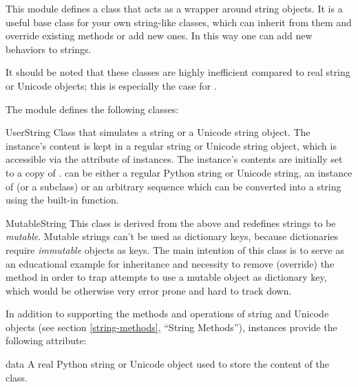 

This module defines a class that acts as a wrapper around string
objects.  It is a useful base class for your own string-like classes,
which can inherit from them and override existing methods or add new
ones.  In this way one can add new behaviors to strings.

It should be noted that these classes are highly inefficient compared
to real string or Unicode objects; this is especially the case for
.

The  module defines the following classes:

\begin{classdesc}{UserString}{}
Class that simulates a string or a Unicode string
object.  The instance's content is kept in a regular string or Unicode
string object, which is accessible via the  attribute of
 instances.  The instance's contents are initially
set to a copy of .   can be either a
regular Python string or Unicode string, an instance of
 (or a subclass) or an arbitrary sequence which can
be converted into a string using the built-in  function.
\end{classdesc}

\begin{classdesc}{MutableString}{}
This class is derived from the  above and redefines
strings to be \emph{mutable}.  Mutable strings can't be used as
dictionary keys, because dictionaries require \emph{immutable} objects as
keys.  The main intention of this class is to serve as an educational
example for inheritance and necessity to remove (override) the
 method in order to trap attempts to use a
mutable object as dictionary key, which would be otherwise very
error prone and hard to track down.
\end{classdesc}

In addition to supporting the methods and operations of string and
Unicode objects (see section \ref{string-methods}, ``String
Methods''),  instances provide the following
attribute:

\begin{memberdesc}{data}
A real Python string or Unicode object used to store the content of the
 class.
\end{memberdesc}
